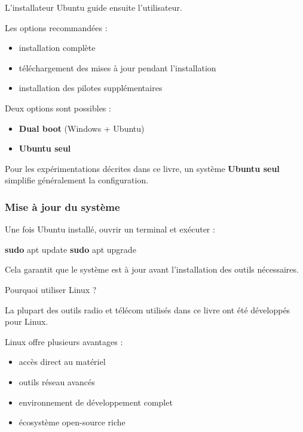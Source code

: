 \documentclass[
  french,
]{article}
\newenvironment{Shaded}{\begin{snugshade}}{\end{snugshade}}
\newcommand{\FunctionTok}[1]{\textcolor[rgb]{0.13,0.29,0.53}{\textbf{#1}}}
\newcommand{\NormalTok}[1]{#1}
\providecommand{\tightlist}{%
  \setlength{\itemsep}{0pt}\setlength{\parskip}{0pt}}
\begin{document}
L'installateur Ubuntu guide ensuite l'utilisateur.

Les options recommandées :

\begin{itemize}
\tightlist
\item
  installation complète
\item
  téléchargement des mises à jour pendant l'installation
\item
  installation des pilotes supplémentaires
\end{itemize}

Deux options sont possibles :

\begin{itemize}
\tightlist
\item
  \textbf{Dual boot} (Windows + Ubuntu)
\item
  \textbf{Ubuntu seul}
\end{itemize}

Pour les expérimentations décrites dans ce livre, un système
\textbf{Ubuntu seul} simplifie généralement la configuration.

\subsubsection{Mise à jour du
système}\label{mise-uxe0-jour-du-systuxe8me}

Une fois Ubuntu installé, ouvrir un terminal et exécuter :

\begin{Shaded}
\begin{Highlighting}[]
\FunctionTok{sudo}\NormalTok{ apt update}
\FunctionTok{sudo}\NormalTok{ apt upgrade}
\end{Highlighting}
\end{Shaded}

Cela garantit que le système est à jour avant l'installation des outils
nécessaires.

Pourquoi utiliser Linux ?

La plupart des outils radio et télécom utilisés dans ce livre ont été
développés pour Linux.

Linux offre plusieurs avantages :

\begin{itemize}
\item
  accès direct au matériel
\item
  outils réseau avancés
\item
  environnement de développement complet
\item
  écosystème open-source riche
\end{itemize}
\end{document}
